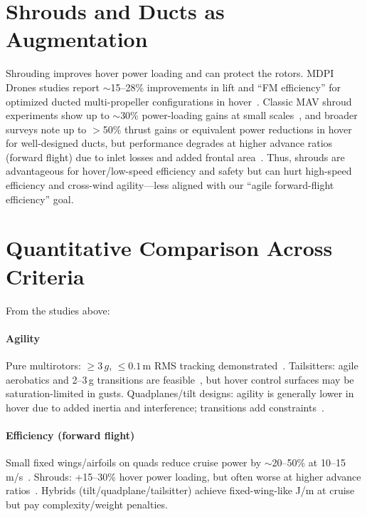 \section{Shrouds and Ducts as Augmentation}

Shrouding improves hover power loading and can protect the rotors.
MDPI Drones studies report $\sim$15--28\% improvements in lift and ``FM efficiency'' for optimized ducted multi-propeller configurations in hover~\cite{Li2021}.
Classic MAV shroud experiments show up to $\sim$30\% power-loading gains at small scales~\cite{Hrishikeshavan2014}, and broader surveys note up to $>$50\% thrust gains or equivalent power reductions in hover for well-designed ducts, but performance degrades at higher advance ratios (forward flight) due to inlet losses and added frontal area~\cite{Chew2021,Pereira2008}.
Thus, shrouds are advantageous for hover/low-speed efficiency and safety but can hurt high-speed efficiency and cross-wind agility---less aligned with our ``agile forward-flight efficiency'' goal.


\section{Quantitative Comparison Across Criteria}

From the studies above:

\paragraph{Agility}
Pure multirotors: $\geq 3\,g$, $\leq 0.1\,\mathrm{m}$ RMS tracking demonstrated~\cite{Tal2018,Foehn2022}.
Tailsitters: agile aerobatics and 2--3\,g transitions are feasible~\cite{Lu2022,Tal2022Global}, but hover control surfaces may be saturation-limited in gusts.
Quadplanes/tilt designs: agility is generally lower in hover due to added inertia and interference; transitions add constraints~\cite{Okulski2022,Misra2022}.

\paragraph{Efficiency (forward flight)}
Small fixed wings/airfoils on quads reduce cruise power by $\sim$20--50\% at 10--15\,m/s~\cite{Dawkins2018,Xiao2020,Freitas2025}.
Shrouds: +15--30\% hover power loading, but often worse at higher advance ratios~\cite{Li2021,Hrishikeshavan2014,Chew2021}.
Hybrids (tilt/quadplane/tailsitter) achieve fixed-wing-like J/m at cruise but pay complexity/weight penalties.

